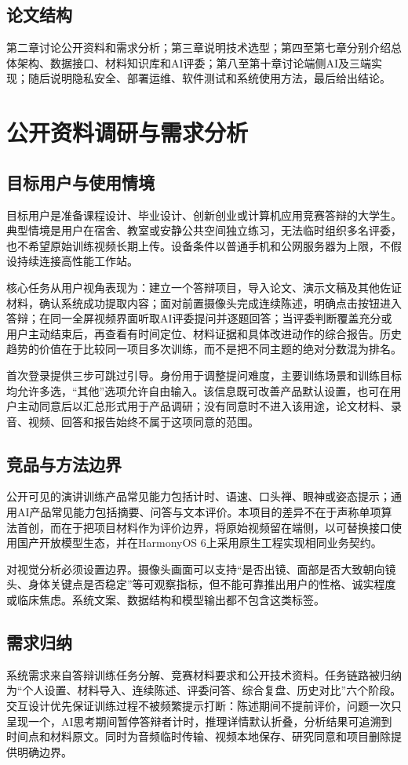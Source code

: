 \section{论文结构}
第二章讨论公开资料和需求分析；第三章说明技术选型；第四至第七章分别介绍总体架构、数据接口、材料知识库和AI评委；第八至第十章讨论端侧AI及三端实现；随后说明隐私安全、部署运维、软件测试和系统使用方法，最后给出结论。

\chapter{公开资料调研与需求分析}
\section{目标用户与使用情境}
目标用户是准备课程设计、毕业设计、创新创业或计算机应用竞赛答辩的大学生。典型情境是用户在宿舍、教室或安静公共空间独立练习，无法临时组织多名评委，也不希望原始训练视频长期上传。设备条件以普通手机和公网服务器为上限，不假设持续连接高性能工作站。

核心任务从用户视角表现为：建立一个答辩项目，导入论文、演示文稿及其他佐证材料，确认系统成功提取内容；面对前置摄像头完成连续陈述，明确点击按钮进入答辩；在同一全屏视频界面听取AI评委提问并逐题回答；当评委判断覆盖充分或用户主动结束后，再查看有时间定位、材料证据和具体改进动作的综合报告。历史趋势的价值在于比较同一项目多次训练，而不是把不同主题的绝对分数混为排名。

首次登录提供三步可跳过引导。身份用于调整提问难度，主要训练场景和训练目标均允许多选，“其他”选项允许自由输入。该信息既可改善产品默认设置，也可在用户主动同意后以汇总形式用于产品调研；没有同意时不进入该用途，论文材料、录音、视频、回答和报告始终不属于这项同意的范围。

\section{竞品与方法边界}
公开可见的演讲训练产品常见能力包括计时、语速、口头禅、眼神或姿态提示；通用AI产品常见能力包括摘要、问答与文本评价。本项目的差异不在于声称单项算法首创，而在于把项目材料作为评价边界，将原始视频留在端侧，以可替换接口使用国产开放模型生态，并在HarmonyOS 6上采用原生工程实现相同业务契约。

对视觉分析必须设置边界。摄像头画面可以支持“是否出镜、面部是否大致朝向镜头、身体关键点是否稳定”等可观察指标，但不能可靠推出用户的性格、诚实程度或临床焦虑。系统文案、数据结构和模型输出都不包含这类标签。

\section{需求归纳}
系统需求来自答辩训练任务分解、竞赛材料要求和公开技术资料。任务链路被归纳为“个人设置、材料导入、连续陈述、评委问答、综合复盘、历史对比”六个阶段。交互设计优先保证训练过程不被频繁提示打断：陈述期间不提前评价，问题一次只呈现一个，AI思考期间暂停答辩者计时，推理详情默认折叠，分析结果可追溯到时间点和材料原文。同时为音频临时传输、视频本地保存、研究同意和项目删除提供明确边界。

